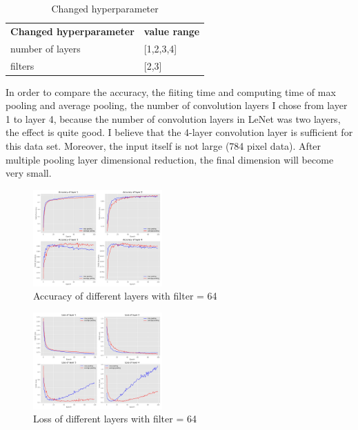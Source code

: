 \documentclass{article}
\begin{document}
\begin{table}[htbp]
  \centering
  \caption{Changed hyperparameter}
    \begin{tabular}{ll}
    \textbf{Changed hyperparameter} & \textbf{value range} \\
    number of layers & [1,2,3,4] \\
    filters & [2,3] \\
    \end{tabular}%
  \label{tab:addlabel}%
\end{table}%
In order to compare the accuracy, the fiiting time and computing time of max pooling and average pooling, the number of convolution layers I chose from layer 1 to layer 4, because the number of convolution layers in LeNet was two layers, the effect is quite good. I believe that the 4-layer convolution layer is sufficient for this data set. Moreover, the input itself is not large (784 pixel data). After multiple pooling layer dimensional reduction, the final dimension will become very small.
\begin{figure}[H] %
	\centering %
	\includegraphics[width=0.44\textwidth]{./pic/part2/max_average_layer_acc.pdf} %
	\caption{Accuracy of different layers with filter = 64} %
	\label{Fig.main2} %
\end{figure}
\begin{figure}[H] %
	\centering %
	\includegraphics[width=0.44\textwidth]{./pic/part2/max_average_layer_loss.pdf} %
	\caption{Loss of different layers with filter = 64} %
	\label{Fig.main2} %
\end{figure}
\end{document}
